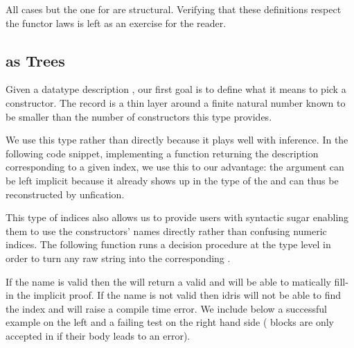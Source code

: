 All cases but the one for  are structural.
%
Verifying that these definitions respect the functor laws is left as
an exercise for the reader.

\subsection{ as Trees}

Given a datatype description , our first goal is
to define what it means to pick a constructor.
%
The  record is a thin layer around a finite
natural number known to be smaller than the number of constructors
this type provides.


We use this type rather than  directly because it
plays well with inference.
%
In the following code snippet, implementing a function returning
the description corresponding to a given index,
we use this to our advantage:
the  argument can be left implicit because it already
shows up in the type of the  and can thus be
reconstructed by unfication.



This type of indices also allows us to provide users with
syntactic sugar enabling them to use the constructors' names
directly rather than confusing numeric indices.
%
The following function runs a decision procedure
 at the type level
in order to turn any raw string 
into the corresponding .


If the name is valid then the  will
return a valid  and \idris{} will be able to
matically fill-in the implicit proof.
%
If the name is not valid then idris will not be able to
find the index and will raise a compile time error.
%
We include below a successful example on the left and a failing test
on the right hand side ( blocks are only
accepted in \idris{} if their body leads to an error).

\begin{minipage}[t]{0.3\textwidth}
\end{minipage}\hfill
\begin{minipage}[t]{0.5\textwidth}
\end{minipage}

